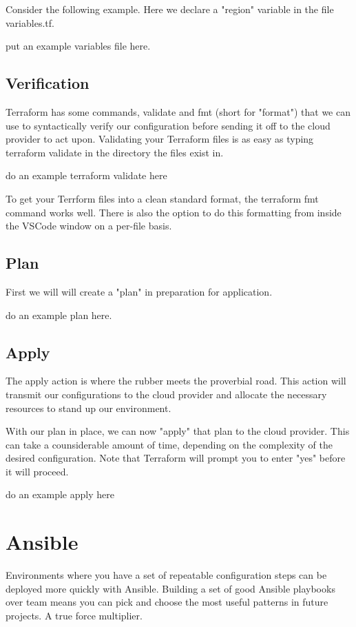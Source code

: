 \justify
Consider the following example. Here we declare a "region" variable in
the file variables.tf.

put an example variables file here.

\subsection{Verification}

\justify
Terraform has some commands, validate and fmt (short for "format") that
we can use to syntactically verify our configuration before sending it
off to the cloud provider to act upon. Validating your Terraform files
is as easy as typing terraform validate in the directory the files exist
in.

do an example terraform validate here

To get your Terrform files into a clean standard format, the
terraform fmt command works well. There is also the option to do this
formatting from inside the VSCode window on a per-file basis.

\subsection{Plan}

First we will will create a "plan" in preparation for application.

do an example plan here.

\subsection{Apply}

The apply action is where the rubber meets the proverbial road. This
action will transmit our configurations to the cloud provider and
allocate the necessary resources to stand up our environment.

With our plan in place, we can now "apply" that plan to the cloud
provider. This can take a counsiderable amount of time, depending on the
complexity of the desired configuration. Note that Terraform will prompt
you to enter "yes" before it will proceed.

do an example apply here

\section{Ansible}

\justify
Environments where you have a set of repeatable configuration steps can
be deployed more quickly with Ansible. Building a set of good Ansible
playbooks over team means you can pick and choose the most useful
patterns in future projects. A true force multiplier.

